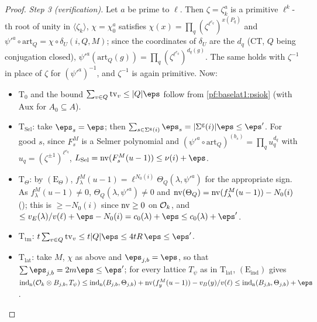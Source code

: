 \begin{proof}
\emph{Step 3 (verification).} Let $a$ be prime to $\ell$. Then $\zeta=\zeta_k^a$ is a primitive $\ell^k$-th root of unity in
$\langle\zeta_k\rangle$, $\chi=\chi_0^a$ satisfies $\chi(x)=\prod_q(\zeta^{\ell^{e_q}})^{x(P_q)}$ and
$\psi'^a\circ\mathrm{art}_Q=\chi\circ\delta_U(i,Q,M)$; since the coordinates of $\delta_U$ are the $d_q$ ($\mathrm{CT}$, $Q$
being conjugation closed), $\psi'^a(\mathrm{art}_Q(g))=\prod_q(\zeta^{\ell^{e_q}})^{d_q(g)}$. The same holds with $\zeta^{-1}$
in place of $\zeta$ for $(\psi'^a)^{-1}$, and $\zeta^{-1}$ is again primitive. Now:
\begin{itemize}
\item $\mathrm{T}_0$ and the bound $\sum_{v\in Q}\mathrm{tv}_v\le|Q|\eps$ follow from \cref{pf:baselat1:psiok} (with
  $\mathrm{Aux}$ for $A_0\subseteq A$).
\item $\mathrm{T}_{\mathrm{Sel}}$: take $\eps_s=\eps$; then $\sum_{s\in\Sigma^{\mathrm g}(i)}\eps_s=|\Sigma^{\mathrm g}(i)|\eps\le\eps'$. For good $s$,
  since $F^M_s$ is a Selmer polynomial and $(\psi'^a\circ\mathrm{art}_Q)^{(b_s)}=\prod_qu_q^{d_q}$ with $u_q=(\zeta^{\pm1})^{\ell^{e_q}}$,
  $L_{\mathrm{Sel}}=\baselatonenv(F^M_s(u-1))\le\nu(i)+\eps$.
\item $\mathrm{T}_{\Theta}$: by $(\mathrm{E}_{\Theta})$, $f^M_\lambda(u-1)=\ell^{N_0(i)}\Theta_Q(\lambda,\psi'^a)$ for the appropriate sign.
  As $f^M_\lambda(u-1)\ne0$, $\Theta_Q(\lambda,\psi'^a)\ne0$ and
  $\operatorname{nv}(\Theta_Q)=\operatorname{nv}(f^M_\lambda(u-1))-N_0(i)$ (); this is
  $\ge-N_0(i)$ since $\operatorname{nv}\ge0$ on $\mathcal O_k$, and $\le v_E(\lambda)/v(\ell)+\eps-N_0(i)=c_0(\lambda)+\eps\le
  c_0(\lambda)+\eps'$.
\item $\mathrm{T}_{\mathrm{tm}}$: $t\sum_{v\in Q}\mathrm{tv}_v\le t|Q|\eps\le4tR\,\eps\le\eps'$.
\item $\mathrm{T}_{\mathrm{lat}}$: take $M$, $\chi$ as above and $\eps_{j,b}=\eps$, so that $\sum\eps_{j,b}=2m\eps\le\eps'$; for every
  lattice $T_\psi$ as in $\mathrm{T}_{\mathrm{lat}}$, $(\mathrm{E}_{\mathrm{ind}})$ gives
  $\operatorname{ind}_{\mathrm n}(\baselatoneO_k\otimes B_{j,b},T_\psi)\le\operatorname{ind}_{\mathrm n}(B_{j,b},\Theta_{j,b})+\baselatonenv(f^M_y(u-1))-v_B(y)/v(\ell)
  \le\operatorname{ind}_{\mathrm n}(B_{j,b},\Theta_{j,b})+\eps$.\qedhere
\end{itemize}
\end{proof}

